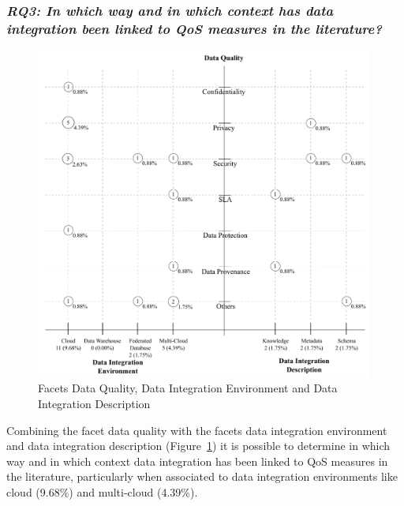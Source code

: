 \subsubsection{\textit{RQ3:  In which way and in which context has data integration been linked to QoS measures in the literature?}}
\begin{figure}[!h]
\centering
\includegraphics[width=0.99\textwidth]{figs/bubble-charts/Data-Quality-DI.pdf}
\caption{Facets Data Quality, Data Integration Environment and Data Integration Description}\label{fig:facet4}
\end{figure}

Combining the facet data quality with the facets data integration environment and data integration description
(Figure~\ref{fig:facet4}) it is possible to determine in which way and in which context data integration has been linked to QoS measures in the literature, particularly when associated to data integration environments like cloud  (9.68\%) and multi-cloud (4.39\%).

